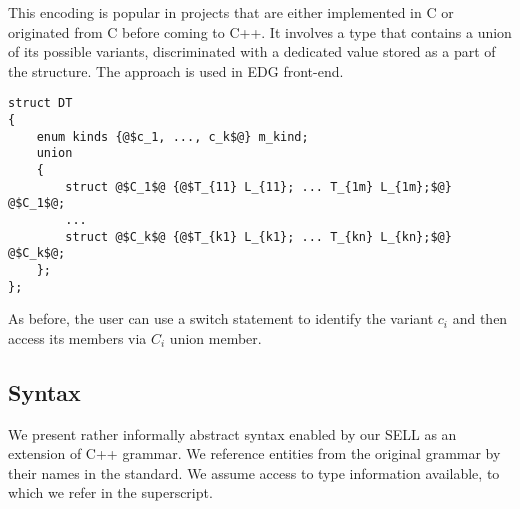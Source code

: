 \documentclass[preprint]{sigplanconf}
\begin{document}
This encoding is popular in projects that are either implemented in C or 
originated from C before coming to C++. It involves a type that contains a union 
of its possible variants, discriminated with a dedicated value stored as a part 
of the structure. The approach is used in EDG front-end\cite{EDG}.

\begin{lstlisting}[keepspaces,columns=flexible]
struct DT
{
    enum kinds {@$c_1, ..., c_k$@} m_kind;
    union
    {
        struct @$C_1$@ {@$T_{11} L_{11}; ... T_{1m} L_{1m};$@} @$C_1$@;
        ...
        struct @$C_k$@ {@$T_{k1} L_{k1}; ... T_{kn} L_{kn};$@} @$C_k$@; 
    };
};
\end{lstlisting}

As before, the user can use a switch statement to identify the variant $c_i$ and 
then access its members via $C_i$ union member.

\subsection{Syntax}

We present rather informally abstract syntax enabled by our SELL as an extension of 
C++ grammar\cite[\textsection A]{C++0x}. We reference entities from the original 
grammar by their names in the standard. We assume access to type information 
available, to which we refer in the superscript.
\end{document}

